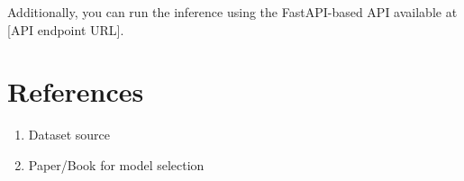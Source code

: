 \documentclass[12pt]{article}
\begin{document}
Additionally, you can run the inference using the FastAPI-based API available at [API endpoint URL].

\section{References}
\begin{enumerate}
    \item Dataset source
    \item Paper/Book for model selection
\end{enumerate}
\end{document}
